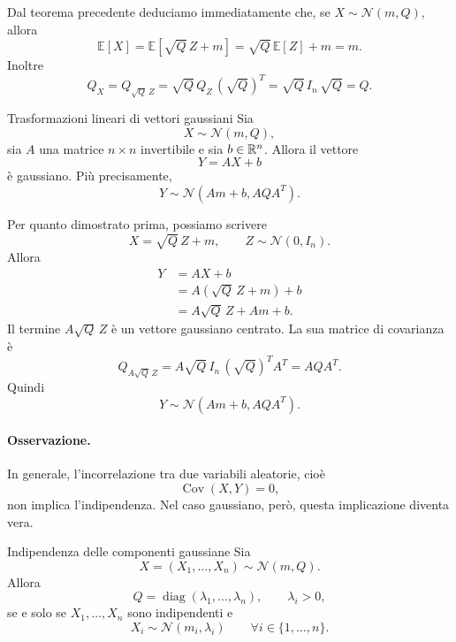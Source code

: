 \documentclass[a4paper]{article}
\begin{document}
Dal teorema precedente deduciamo immediatamente che, se \(X\sim\mathcal N(m,Q)\), allora
\[
    \mathbb E[X]
    =
    \mathbb E[\sqrt Q\,Z+m]
    =
    \sqrt Q\,\mathbb E[Z]+m
    =
    m.
\]
Inoltre
\[
    Q_X
    =
    Q_{\sqrt Q\,Z}
    =
    \sqrt Q\,Q_Z\,(\sqrt Q)^T
    =
    \sqrt Q\,I_n\,\sqrt Q
    =
    Q.
\]

\begin{snippetproposition}{Trasformazioni lineari di vettori gaussiani}
    Sia
    \[
        X\sim\mathcal N(m,Q),
    \]
    sia \(A\) una matrice \(n\times n\) invertibile e sia \(b\in\mathbb{R}^n\).
    Allora il vettore
    \[
        Y=AX+b
    \]
    è gaussiano. Più precisamente,
    \[
        Y\sim\mathcal N(Am+b,AQA^T).
    \]
\end{snippetproposition}

\begin{snippetproof}{}
    Per quanto dimostrato prima, possiamo scrivere
    \[
        X=\sqrt Q\,Z+m,
        \qquad
        Z\sim\mathcal N(0,I_n).
    \]
    Allora
    \begin{align*}
        Y
        &=
        AX+b\\
        &=
        A(\sqrt Q\,Z+m)+b\\
        &=
        A\sqrt Q\,Z+Am+b.
    \end{align*}
    Il termine \(A\sqrt Q\,Z\) è un vettore gaussiano centrato. La sua matrice di covarianza è
    \[
        Q_{A\sqrt Q\,Z}
        =
        A\sqrt Q\,I_n\,(\sqrt Q)^TA^T
        =
        AQA^T.
    \]
    Quindi
    \[
        Y\sim\mathcal N(Am+b,AQA^T).
    \]
\end{snippetproof}

\paragraph{Osservazione.}
In generale, l'incorrelazione tra due variabili aleatorie, cioè
\[
    \operatorname{Cov}(X,Y)=0,
\]
non implica l'indipendenza. Nel caso gaussiano, però, questa implicazione diventa vera.

\begin{snippettheorem}{Indipendenza delle componenti gaussiane}
    Sia
    \[
        X=(X_1,\ldots,X_n)\sim\mathcal N(m,Q).
    \]
    Allora
    \[
        Q=\operatorname{diag}(\lambda_1,\ldots,\lambda_n),
        \qquad
        \lambda_i>0,
    \]
    se e solo se \(X_1,\ldots,X_n\) sono indipendenti e
    \[
        X_i\sim\mathcal N(m_i,\lambda_i)
        \qquad
        \forall i\in\{1,\ldots,n\}.
    \]
\end{snippettheorem}
\end{document}
